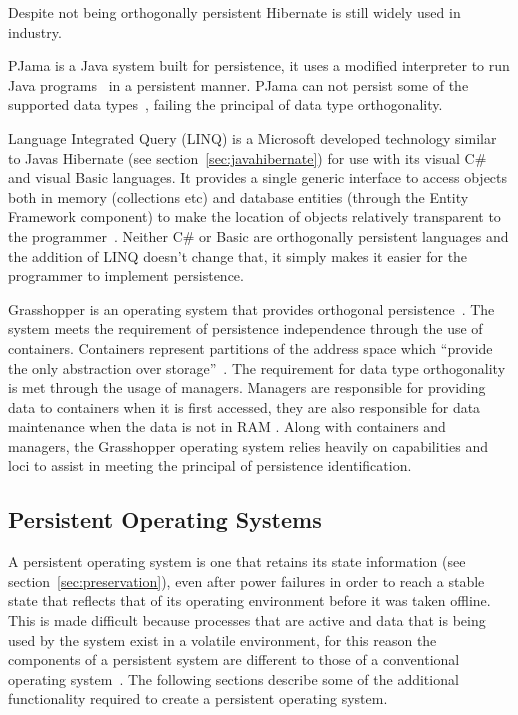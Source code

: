 \documentclass[a4paper,12pt]{article}
\begin{document}
Despite not being orthogonally persistent Hibernate is still widely used in industry.
\\\par
\label{sec:pjama}
PJama is a Java system built for persistence, it uses a modified interpreter to run Java programs~\citep{persistentjavasystem} in a persistent manner. PJama can not persist some of the supported data types~\citep{ADearle}, failing the principal of data type orthogonality. 
\\\par
Language Integrated Query (LINQ)
is a Microsoft developed technology similar to Javas Hibernate (see section~\ref{sec:javahibernate}) for use with its visual C\# and visual Basic languages. It provides a single generic interface to access objects both in memory (collections etc) and database entities (through the Entity Framework component) to make the location of objects relatively transparent to the programmer~\citep{ADearle}.
Neither C\# or Basic are orthogonally persistent languages and the addition of LINQ doesn't change that, it simply makes it easier for the programmer to implement persistence.
\\\par
Grasshopper\label{sec:grasshopper} 
is an operating system that provides orthogonal persistence~\citep{Grasshopper}. 
The system meets the requirement of persistence independence through the use of containers. Containers represent partitions of the address space which ``provide the only abstraction over storage''~\citep[p~3]{Grasshopper}.
The requirement for data type orthogonality is met through the usage of managers. Managers are responsible for providing data to containers when it is first accessed, they are also responsible for data maintenance when the data is not in RAM \citep{Grasshopper}.
Along with containers and managers, the Grasshopper operating system relies heavily on capabilities and loci to assist in meeting the principal of persistence identification.
\\\par
\subsection{Persistent Operating Systems}\label{sec:persistentOS}
A persistent operating system is one that retains its state information (see section~\ref{sec:preservation}), even after power failures in order to reach a stable state that reflects that of its operating environment before it was taken offline. This is made difficult because processes that are active and data that is being used by the system exist in a volatile environment, for this reason the components of a persistent system are different to those of a conventional operating system~\citep{Grasshopper}. The following sections describe some of the additional functionality required to create a persistent operating system.
\end{document}
